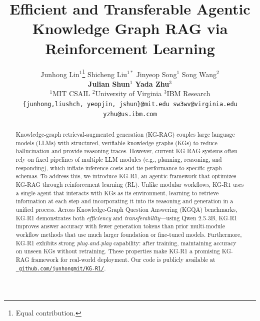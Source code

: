 \documentclass{article}
\title{Efficient and Transferable Agentic Knowledge Graph RAG via Reinforcement Learning}
\author{
    Junhong Lin$^{1}$\thanks{Equal contribution.}
    \quad
    Shicheng Liu$^{1*}$
    \quad
    Jinyeop Song$^{1}$
    \quad
    Song Wang$^{2}$
    \\
    \textbf{ Julian Shun$^{1}$}
    \quad
    \textbf{Yada Zhu$^{3}$}
    \\[0.35em]
    $^{1}$MIT CSAIL \quad
    $^{2}$University of Virginia \quad
    $^{3}$IBM Research
    \\[0.25em]
    \texttt{\small \{junhong,liushch, yeopjin, jshun\}@mit.edu \quad sw3wv@virginia.edu}\\
    \texttt{\small yzhu@us.ibm.com}
}
\newcommand{\framework}{\textsc{KG-R1}}
\begin{document}
\maketitle


\begin{abstract}
Knowledge-graph retrieval-augmented generation (KG-RAG) couples large language models (LLMs) with structured, verifiable knowledge graphs (KGs) to reduce hallucination and provide reasoning traces. However, current KG-RAG systems often rely on fixed pipelines of multiple LLM modules (e.g., planning, reasoning, and responding), which inflate inference costs and tie performance to specific graph schemas. To address this, we introduce \framework{}, an agentic framework that optimizes KG-RAG through reinforcement learning (RL). Unlike modular workflows, \framework{} uses a single agent that interacts with KGs as its environment, learning to retrieve information at each step and incorporating it into its reasoning and generation in a unified process. Across Knowledge-Graph Question Answering (KGQA) benchmarks, \framework{} demonstrates both \emph{efficiency} and \emph{transferability}---using Qwen 2.5-3B, \framework{} improves answer accuracy with fewer generation tokens than prior multi-module workflow methods that use much larger foundation or fine-tuned models. Furthermore, \framework{} exhibits strong \emph{plug-and-play} capability: after training, maintaining accuracy on unseen KGs without retraining. These properties make \framework{} a promising KG-RAG framework for real-world deployment. Our code is publicly available at \href{https://github.com/junhongmit/KG-R1}{\faGithub~\texttt{github.com/junhongmit/KG-R1/}}.
\end{abstract}











\newpage



\newpage
\appendix



\newpage

\end{document}

